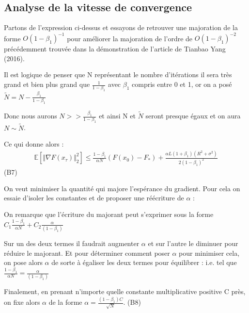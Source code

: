 \documentclass{article}
\begin{document}
\subsection{Analyse de la vitesse de convergence}

Partons de l'expression ci-dessus et essayons de retrouver une majoration de la forme $O(1-\beta_1)^{-1} $ pour améliorer la majoration de l'ordre de $O(1-\beta_1)^{-2}$ précédemment trouvée dans la démonstration de l'article de Tianbao Yang (2016). 

\bigskip


\bigskip

Il est logique de penser que N représentant le nombre d'itérations il sera très grand et bien plus grand que $\frac{1}{1-\beta_1}$ avec $\beta_1$ compris entre 0 et 1, or on a posé $\tilde{N}=N-\frac{\beta_1}{1-\beta_1}$

\bigskip

Donc nous aurons $N>>\frac{\beta_1}{1-\beta_1}$ et ainsi N et $\tilde{N}$ seront presque égaux et on aura $N \sim \tilde{N} $.

\bigskip

Ce qui donne alors : 
\begin{eqnarray*}
    \mathbb{E}[ \Vert \nabla F(x_\tau) \Vert ^2_2] \leq \frac{1- \beta_1}{\alpha N} (F(x_0)-F_*) + \frac{\alpha L (1+ \beta_1) (R^2+ \sigma^2)}{2(1- \beta_1)^2}
\end{eqnarray*} \hspace{\fill}(B7) 

\bigskip

On veut minimiser la quantité qui majore l'espérance du gradient. Pour cela on essaie d'isoler les constantes et de proposer une réécriture de $\alpha$ :

\bigskip

On remarque que l'écriture du majorant peut s'exprimer sous la forme $C_1 \frac{1-\beta_1}{\alpha N}+C_2 \frac{\alpha}{ (1- \beta_1)}$ 

\bigskip

Sur un des deux termes il faudrait augmenter $\alpha$ et sur l'autre le diminuer pour réduire le majorant. Et pour déterminer comment poser $\alpha$ pour minimiser cela, on pose alors $\alpha$ de sorte à égaliser les deux termes pour équilibrer : i.e. tel que $ \frac{1-\beta_1}{\alpha N}=\frac{\alpha}{ (1- \beta_1)}$ 

\bigskip

Finalement, en prenant n'importe quelle constante multiplicative positive C près, on fixe alors $\alpha$ de la forme $\alpha=\frac{(1-\beta_1) C}{\sqrt{N}}$. \hspace{\fill}(B8)   
\end{document}

